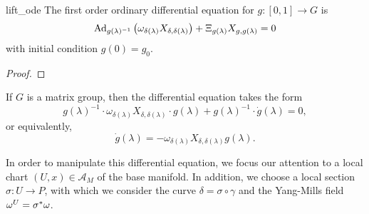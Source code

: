 \begin{theorem}{}{lift_ode}
    The first order ordinary differential equation for \(g : [0,1] \to G\) is
    \begin{equation*}
        \operatorname{Ad}_{g(\lambda)^{-1}}\left(\omega_{\delta(\lambda)}X_{\delta, \delta(\lambda)}\right) + \Xi_{g(\lambda)}X_{g, g(\lambda)} = 0
    \end{equation*}
    with initial condition \(g(0) = g_0\).
\end{theorem}
\begin{proof}
\end{proof}
\begin{corollary}
    If \(G\) is a matrix group, then the differential equation takes the form
    \begin{equation*}
        g(\lambda)^{-1} \cdot \omega_{\delta(\lambda)} X_{\delta,\delta(\lambda)} \cdot g(\lambda) + g(\lambda)^{-1} \cdot \dot{g}(\lambda) = 0,
    \end{equation*}
    or equivalently,
    \begin{equation*}
        \dot{g}(\lambda) = - \omega_{\delta(\lambda)}X_{\delta,\delta(\lambda)} g(\lambda).
    \end{equation*}
\end{corollary}

In order to manipulate this differential equation, we focus our attention to a local chart \((U,x) \in \mathscr{A}_M\) of the base manifold. In addition, we choose a local section \(\sigma : U \to P\), with which we consider the curve \(\delta = \sigma \circ \gamma\) and the Yang-Mills field \(\omega^U = {\sigma}^{\ast}_{}\omega\).

